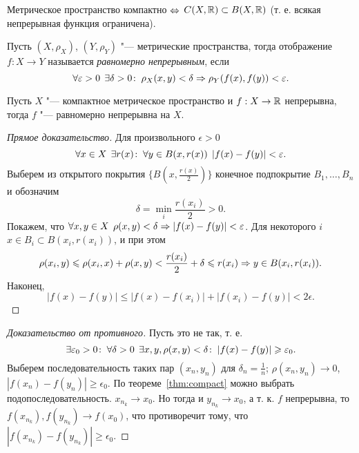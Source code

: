 \documentclass[main]{subfiles}
\begin{document}
\begin{exercise}
  Метрическое пространство компактно \( \Leftrightarrow \)
  \( C(X, \mathbb{R}) \subset B(X, \mathbb{R}) \)
  (т. е. всякая непрерывная функция ограничена).
\end{exercise}

\begin{definition}
  Пусть \( (X, \rho_X) \), \( (Y, \rho_Y) \) "---
  метрические пространства, тогда
  отображение \( f : X \to Y \) называется
  \emph{равномерно непрерывным}, если
  \[
    \forall {\varepsilon> 0} \; \,
    \exists \delta > 0 \colon \:
    \rho_X(x, y) < \delta \Rightarrow
    \rho_Y(f(x), f(y)) < \varepsilon.
  \]
\end{definition}

\begin{theorem*}[Кантора]
  Пусть \( X \) "--- компактное метрическое пространство
  и \( f : X \to \mathbb{R} \) непрерывна,
  тогда \( f \) "--- равномерно непрерывна на \( X \).
\end{theorem*}
\begin{proof}[Прямое доказательство]
  Для произвольного \( \epsilon > 0 \)
  \[
    \forall {x \in X} \; \, \exists r(x) \colon \:
    \forall {y \in B(x, r(x))} \; \,
    |f(x) - f(y)| < \varepsilon.
  \]
  Выберем из открытого покрытия
  \( \{ B(x, \frac{r(x)}{2}) \} \) конечное
  подпокрытие \( B_1, \dots, B_n \)
  и обозначим \[ \delta = \min_i \frac{r(x_i)}{2} > 0. \]
  Покажем, что \( \forall {x, y \in X} \; \, \rho(x, y) < \delta
  \Rightarrow |f(x) - f(y)| < \varepsilon \).
  Для некоторого \( i \) \( x \in B_i \subset B(x_i, r(x_i)) \),
  и при этом
  \[
    \rho(x_i, y) \leqslant
    \rho(x_i, x) + \rho(x, y) <
    \frac{r(x_i)}{2} + \delta \leqslant
    r(x_i) \Rightarrow y \in B(x_i, r(x_i)).
  \]
  Наконец,
  \[
    |f(x) - f(y)| \le
    |f(x) - f(x_i)| + |f(x_i) - f(y)| <
    2 \epsilon.
  \]
\end{proof}
\begin{proof}[Доказательство от противного]
  Пусть это не так, т. е.
  \[
    \exists \varepsilon_0 > 0 \colon \:
    \forall {\delta > 0} \; \,
    \exists x, y, \rho(x, y) < \delta \colon \:
    |f(x) - f(y)| \geqslant \varepsilon_0.
  \]
  Выберем последовательность таких пар \( (x_n, y_n) \)
  для \( \delta_n = \frac{1}{n} \); \( \rho(x_n, y_n) \to 0 \),
  \( |f(x_n) - f(y_n)| \ge \epsilon_0 \).
  По теореме~\ref{thm:compact} можно выбрать подопоследовательность.
  \( x_{n_k} \to x_0 \). Но тогда и \( y_{n_k} \to x_0 \),
  а т. к. \( f \) непрерывна, то \( f(x_{n_k}), f(y_{n_k}) \to f(x_0) \),
  что противоречит тому, что
  \( |f(x_{n_k}) - f(y_{n_k})| \ge \epsilon_0 \).
\end{proof}
\end{document}
